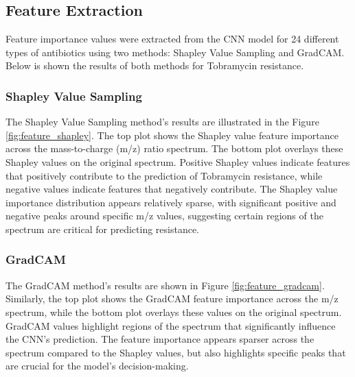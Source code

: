 \documentclass[english,11pt,a4paper,titlepage]{article}
\begin{document}
\subsection*{Feature Extraction}
Feature importance values were extracted from the CNN model for 24 different types of antibiotics using two methods: Shapley Value Sampling and GradCAM. Below is shown the results of both methods for Tobramycin resistance.

\subsubsection*{Shapley Value Sampling}
The Shapley Value Sampling method's results are illustrated in the Figure \ref{fig:feature_shapley}. The top plot shows the Shapley value feature importance across the mass-to-charge (m/z) ratio spectrum. The bottom plot overlays these Shapley values on the original spectrum. Positive Shapley values indicate features that positively contribute to the prediction of Tobramycin resistance, while negative values indicate features that negatively contribute. The Shapley value importance distribution appears relatively sparse, with significant positive and negative peaks around specific m/z values, suggesting certain regions of the spectrum are critical for predicting resistance.

\subsubsection*{GradCAM}
The GradCAM method's results are shown in Figure \ref{fig:feature_gradcam}. Similarly, the top plot shows the GradCAM feature importance across the m/z spectrum, while the bottom plot overlays these values on the original spectrum. GradCAM values highlight regions of the spectrum that significantly influence the CNN's prediction. The feature importance appears sparser across the spectrum compared to the Shapley values, but also highlights specific peaks that are crucial for the model's decision-making.
\end{document}
